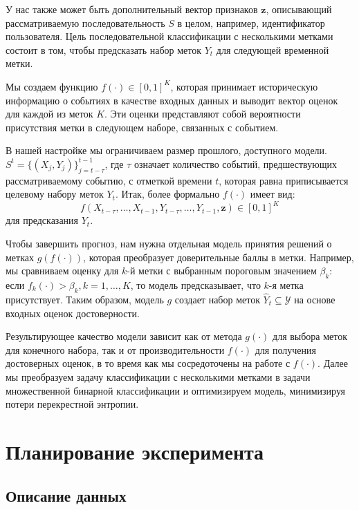 \documentclass[a4paper, 12pt]{article} %
\begin{document}
У нас также может быть дополнительный вектор признаков $\mathbf{z}$, описывающий рассматриваемую последовательность $S$ в целом, например, идентификатор пользователя.
Цель последовательной классификации с несколькими метками состоит в том, чтобы предсказать набор меток $Y_{t}$ для следующей временной метки.

Мы создаем функцию $f(\cdot) \in [0, 1]^K$, которая принимает историческую информацию о событиях в качестве входных данных и выводит вектор оценок для каждой из меток $K$. Эти оценки представляют собой вероятности присутствия метки в следующем наборе, связанных с событием.

В нашей настройке мы ограничиваем размер прошлого, доступного модели.
$S^t = \{(X_{j}, Y_{j})\}_{j = t - \tau}^{t-1}$, где $\tau$ означает количество событий, предшествующих рассматриваемому событию, с отметкой времени $t$, которая равна приписывается целевому набору меток $Y_{t}$.
Итак, более формально $f(\cdot)$ имеет вид:
$$
f(X_{t - \tau}, \ldots, X_{t-1}, Y_{t - \tau}, \ldots, Y_{t-1}, \textbf{z}) \in [0, 1]^K
$$
для предсказания $Y_{t}$.

Чтобы завершить прогноз, нам нужна отдельная модель принятия решений о метках $g(f(\cdot))$, которая преобразует доверительные баллы в метки.
Например, мы сравниваем оценку для $k$-й метки с выбранным пороговым значением $\beta_k$: если $f_k(\cdot) > \beta_k, k = 1, \dots, K$, то модель предсказывает, что $k$-я метка присутствует. Таким образом, модель $g$ создает набор меток $\hat{Y}_{t} \subseteq \mathcal{Y}$ на основе входных оценок достоверности.

Результирующее качество модели зависит как от метода $g(\cdot)$ для выбора меток для конечного набора, так и от производительности $f(\cdot)$ для получения достоверных оценок, в то время как мы сосредоточены на работе с $f(\cdot)$. Далее мы преобразуем задачу классификации с несколькими метками в задачи множественной бинарной классификации и оптимизируем модель, минимизируя потери перекрестной энтропии.

\section{Планирование эксперимента}

\subsection{Описание данных}
\end{document}

